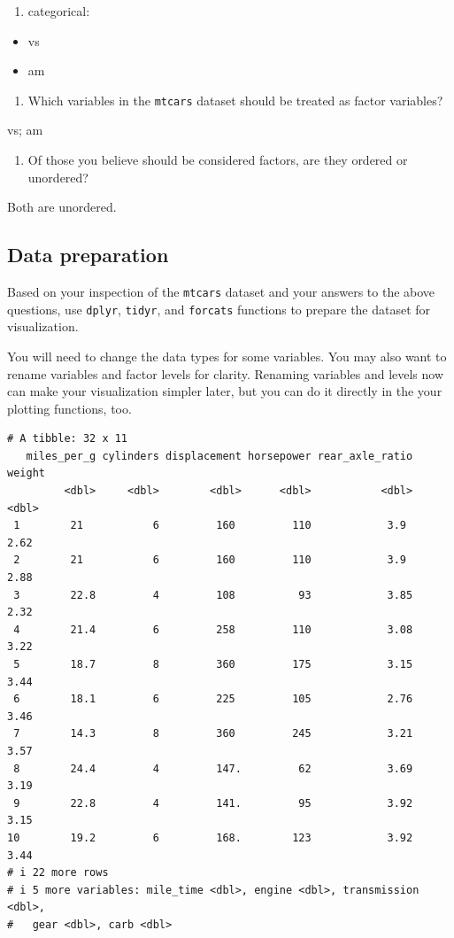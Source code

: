 \documentclass[
  man,
  floatsintext,
  longtable,
  nolmodern,
  notxfonts,
  notimes,
  colorlinks=true,linkcolor=blue,citecolor=blue,urlcolor=blue]{apa7}
\providecommand{\tightlist}{%
  \setlength{\itemsep}{0pt}\setlength{\parskip}{0pt}}
\begin{document}
\begin{enumerate}
\def\labelenumi{\arabic{enumi}.}
\setcounter{enumi}{1}
\tightlist
\item
  categorical:
\end{enumerate}

\begin{itemize}
\tightlist
\item
  vs
\item
  am
\end{itemize}

\begin{enumerate}
\def\labelenumi{\arabic{enumi}.}
\setcounter{enumi}{2}
\tightlist
\item
  Which variables in the \texttt{mtcars} dataset should be treated as
  factor variables?
\end{enumerate}

vs; am

\begin{enumerate}
\def\labelenumi{\arabic{enumi}.}
\setcounter{enumi}{3}
\tightlist
\item
  Of those you believe should be considered factors, are they ordered or
  unordered?
\end{enumerate}

Both are unordered.

\subsection{Data preparation}\label{data-preparation}

Based on your inspection of the \texttt{mtcars} dataset and your answers
to the above questions, use \texttt{dplyr}, \texttt{tidyr}, and
\texttt{forcats} functions to prepare the dataset for visualization.

You will need to change the data types for some variables. You may also
want to rename variables and factor levels for clarity. Renaming
variables and levels now can make your visualization simpler later, but
you can do it directly in the your plotting functions, too.

\begin{verbatim}
# A tibble: 32 x 11
   miles_per_g cylinders displacement horsepower rear_axle_ratio weight
         <dbl>     <dbl>        <dbl>      <dbl>           <dbl>  <dbl>
 1        21           6         160         110            3.9    2.62
 2        21           6         160         110            3.9    2.88
 3        22.8         4         108          93            3.85   2.32
 4        21.4         6         258         110            3.08   3.22
 5        18.7         8         360         175            3.15   3.44
 6        18.1         6         225         105            2.76   3.46
 7        14.3         8         360         245            3.21   3.57
 8        24.4         4         147.         62            3.69   3.19
 9        22.8         4         141.         95            3.92   3.15
10        19.2         6         168.        123            3.92   3.44
# i 22 more rows
# i 5 more variables: mile_time <dbl>, engine <dbl>, transmission <dbl>,
#   gear <dbl>, carb <dbl>
\end{verbatim}
\end{document}
